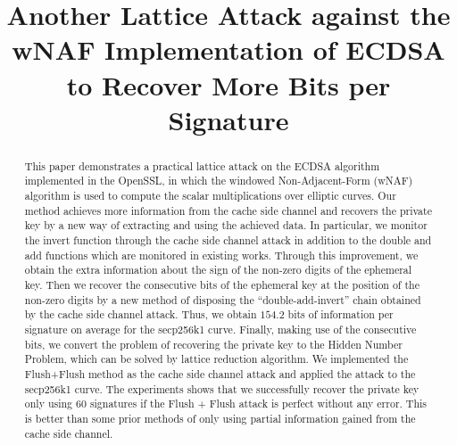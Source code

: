 \documentclass[runningheads]{llncs}
\begin{document}
%
\title{Another Lattice Attack against the wNAF Implementation of ECDSA to Recover More Bits per Signature}
%
%
\maketitle              %
%
\begin{abstract}
This paper demonstrates a practical lattice attack on the ECDSA algorithm implemented in the OpenSSL, in which the windowed Non-Adjacent-Form (wNAF) algorithm is used to compute the scalar multiplications over elliptic curves.
Our method achieves more information from the cache side channel and
    recovers the private key by a new way of extracting and using the achieved data.
In particular, we monitor the invert function through the cache side channel attack
    in addition to the double and add functions which are monitored in existing works.
 Through this improvement, we obtain the extra information about the sign of the non-zero digits of the ephemeral key.
Then we recover the consecutive bits of the ephemeral key at the position of the non-zero digits by a new method of disposing the ``double-add-invert'' chain obtained by the cache side channel attack.
Thus, we obtain $154.2$ bits of information per signature on average for the secp256k1 curve.
Finally, making use of the consecutive bits,
 we convert the problem of recovering the private key to the Hidden Number Problem,
 which can be solved by lattice reduction algorithm.
We implemented the Flush+Flush method as the cache side channel attack and applied the attack to the secp256k1 curve.
The experiments shows that we successfully recover the private key only using $60$ signatures if the Flush + Flush attack is perfect without any error.
This is better than some prior methods of only using partial information gained from the cache side channel.

\end{abstract}
%
%
%
\end{document}
